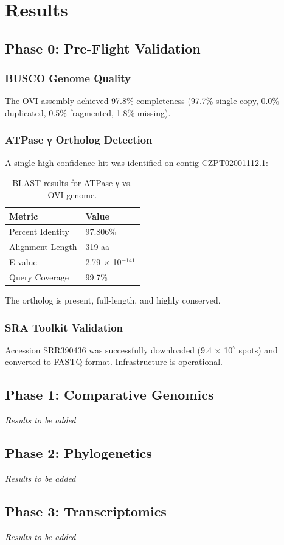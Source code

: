 \chapter{Results}

\section{Phase 0: Pre-Flight Validation}

\subsection{BUSCO Genome Quality}

The \teq{} OVI assembly achieved 97.8\% completeness (97.7\% single-copy, 0.0\% duplicated, 0.5\% fragmented, 1.8\% missing).

\subsection{ATPase γ Ortholog Detection}

A single high-confidence hit was identified on contig CZPT02001112.1:

\begin{table}[H]
\centering
\begin{tabular}{ll}
\toprule
\textbf{Metric} & \textbf{Value} \\
\midrule
Percent Identity & 97.806\% \\
Alignment Length & 319 aa \\
E-value & 2.79 × 10$^{-141}$ \\
Query Coverage & 99.7\% \\
\bottomrule
\end{tabular}
\caption{BLAST results for \tbr{} ATPase γ vs. \teq{} OVI genome.}
\label{tab:blast_results}
\end{table}

The ortholog is present, full-length, and highly conserved.

\subsection{SRA Toolkit Validation}

Accession SRR390436 was successfully downloaded (9.4 × 10$^7$ spots) and converted to FASTQ format. Infrastructure is operational.

\section{Phase 1: Comparative Genomics}

\textit{Results to be added}

\section{Phase 2: Phylogenetics}

\textit{Results to be added}

\section{Phase 3: Transcriptomics}

\textit{Results to be added}

